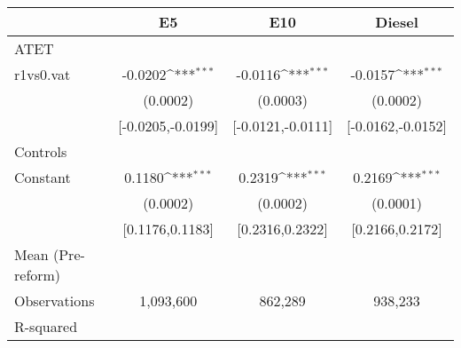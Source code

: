 {
\def\sym#1{\ifmmode^{#1}\else\(^{#1}\)\fi}
\begin{tabular}{l*{3}{c}}
\toprule
                    &\multicolumn{1}{c}{E5}&\multicolumn{1}{c}{E10}&\multicolumn{1}{c}{Diesel}\\
\midrule
ATET                &                     &                     &                     \\
r1vs0.vat           &     -0.0202\sym{***}&     -0.0116\sym{***}&     -0.0157\sym{***}\\
                    &    (0.0002)         &    (0.0003)         &    (0.0002)         \\
                    &[-0.0205,-0.0199]         &[-0.0121,-0.0111]         &[-0.0162,-0.0152]         \\
\midrule
Controls            &                     &                     &                     \\
Constant            &      0.1180\sym{***}&      0.2319\sym{***}&      0.2169\sym{***}\\
                    &    (0.0002)         &    (0.0002)         &    (0.0001)         \\
                    &[0.1176,0.1183]         &[0.2316,0.2322]         &[0.2166,0.2172]         \\
\midrule
Mean (Pre-reform)   &                     &                     &                     \\
Observations        &   1,093,600         &     862,289         &     938,233         \\
R-squared           &                     &                     &                     \\
\bottomrule
\end{tabular}
}
